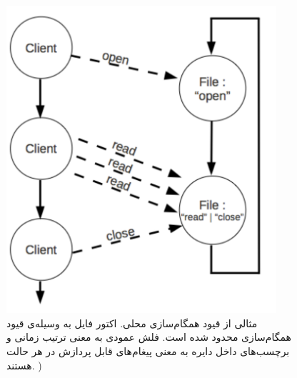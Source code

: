 \begin{figure}
    \begin{center}
	\includegraphics[width=10cm]{3-RelatedWork/Figures/LSC.pdf}
    \end{center}
    \caption{\label{fig:lsc} مثالی از قیود همگام‌سازی محلی. اکتور فایل به وسیله‌ی قیود همگام‌سازی محدود شده است. فلش عمودی به معنی ترتیب زمانی و برچسب‌های داخل دایره به معنی پیغام‌های قابل پردازش در هر حالت هستند. ) }
\end{figure}
